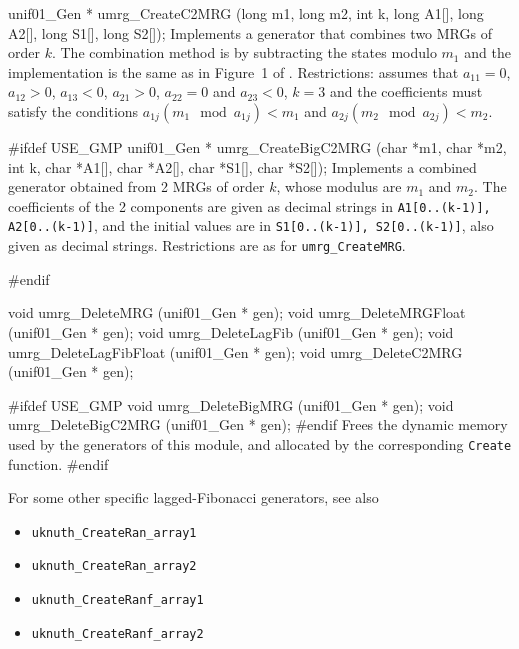 
\code

unif01_Gen * umrg_CreateC2MRG (long m1, long m2, int k, long A1[],
                               long A2[], long S1[], long S2[]);
\endcode
 \tab  Implements a generator that combines two MRGs of order $k$.
   The combination method is by subtracting the states modulo $m_1$
   and the implementation is the same as in Figure~1 of \cite{rLEC96b}.
   Restrictions: assumes that $a_{11} = 0$, $a_{12} > 0$, $a_{13} < 0$,
   $a_{21} > 0$, $a_{22} = 0$ and $a_{23} < 0$,
   $k=3$ and the coefficients must satisfy the conditions
   $a_{1j} (m_1 \mod a_{1j}) < m_1$ and  $a_{2j} (m_2 \mod a_{2j}) < m_2$.
 \endtab
\code


#ifdef USE_GMP
   unif01_Gen * umrg_CreateBigC2MRG (char *m1, char *m2, int k, char *A1[],
                                     char *A2[], char *S1[], char *S2[]);
\endcode
 \tab  Implements a combined generator  obtained from 2 MRGs
   of order $k$, whose modulus are $m_1$ and $m_2$.
   The coefficients of the 2 components are given as decimal strings in
   {\tt  A1[0..(k-1)], A2[0..(k-1)]}, and the initial values
    are in  {\tt S1[0..(k-1)], S2[0..(k-1)]}, also given as decimal strings.
   Restrictions are as for {\tt umrg\_CreateMRG}.

 \endtab
\code
#endif
\endcode




\code

void umrg_DeleteMRG    (unif01_Gen * gen);
void umrg_DeleteMRGFloat (unif01_Gen * gen);
void umrg_DeleteLagFib (unif01_Gen * gen);
void umrg_DeleteLagFibFloat (unif01_Gen * gen);
void umrg_DeleteC2MRG  (unif01_Gen * gen);

#ifdef USE_GMP
   void umrg_DeleteBigMRG (unif01_Gen * gen);
   void umrg_DeleteBigC2MRG (unif01_Gen * gen);
#endif
\endcode
  \tab Frees the dynamic memory used by the generators of this module,
  and allocated by the corresponding {\tt Create} function.
 \endtab
\code
\hide
#endif
\endhide
\endcode

{
\iffalse  %
For other specific MRGs, see also

\begin{itemize}
\item {\tt uwu\_CreateMRGWuG2}   %
\end{itemize}

\bigskip
\fi  %

For some other specific lagged-Fibonacci generators, see also

\begin{itemize}
\item {\tt uknuth\_CreateRan\_array1}
\item {\tt uknuth\_CreateRan\_array2}
\item {\tt uknuth\_CreateRanf\_array1}
\item {\tt uknuth\_CreateRanf\_array2}
\end{itemize}
}
